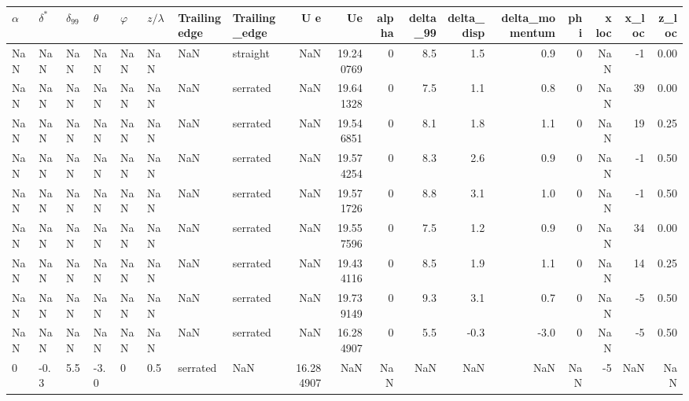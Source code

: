 \begin{tabular}{llllllllrrrrrrrrrr}
\toprule
$\alpha$ & $\delta^*$ & $\delta_{99}$ & $\theta$ & $\varphi$ & $z/\lambda$ & Trailing edge & Trailing_edge &        U e &         Ue &  alpha &  delta_99 &  delta_disp &  delta_momentum &  phi &  x loc &  x_loc &  z_loc \\
\midrule
     NaN &        NaN &           NaN &      NaN &       NaN &         NaN &           NaN &      straight &        NaN &  19.240769 &      0 &       8.5 &         1.5 &             0.9 &    0 &    NaN &     -1 &   0.00 \\
     NaN &        NaN &           NaN &      NaN &       NaN &         NaN &           NaN &      serrated &        NaN &  19.641328 &      0 &       7.5 &         1.1 &             0.8 &    0 &    NaN &     39 &   0.00 \\
     NaN &        NaN &           NaN &      NaN &       NaN &         NaN &           NaN &      serrated &        NaN &  19.546851 &      0 &       8.1 &         1.8 &             1.1 &    0 &    NaN &     19 &   0.25 \\
     NaN &        NaN &           NaN &      NaN &       NaN &         NaN &           NaN &      serrated &        NaN &  19.574254 &      0 &       8.3 &         2.6 &             0.9 &    0 &    NaN &     -1 &   0.50 \\
     NaN &        NaN &           NaN &      NaN &       NaN &         NaN &           NaN &      serrated &        NaN &  19.571726 &      0 &       8.8 &         3.1 &             1.0 &    0 &    NaN &     -1 &   0.50 \\
     NaN &        NaN &           NaN &      NaN &       NaN &         NaN &           NaN &      serrated &        NaN &  19.557596 &      0 &       7.5 &         1.2 &             0.9 &    0 &    NaN &     34 &   0.00 \\
     NaN &        NaN &           NaN &      NaN &       NaN &         NaN &           NaN &      serrated &        NaN &  19.434116 &      0 &       8.5 &         1.9 &             1.1 &    0 &    NaN &     14 &   0.25 \\
     NaN &        NaN &           NaN &      NaN &       NaN &         NaN &           NaN &      serrated &        NaN &  19.739149 &      0 &       9.3 &         3.1 &             0.7 &    0 &    NaN &     -5 &   0.50 \\
     NaN &        NaN &           NaN &      NaN &       NaN &         NaN &           NaN &      serrated &        NaN &  16.284907 &      0 &       5.5 &        -0.3 &            -3.0 &    0 &    NaN &     -5 &   0.50 \\
       0 &       -0.3 &           5.5 &     -3.0 &         0 &         0.5 &      serrated &           NaN &  16.284907 &        NaN &    NaN &       NaN &         NaN &             NaN &  NaN &     -5 &    NaN &    NaN \\
\bottomrule
\end{tabular}
